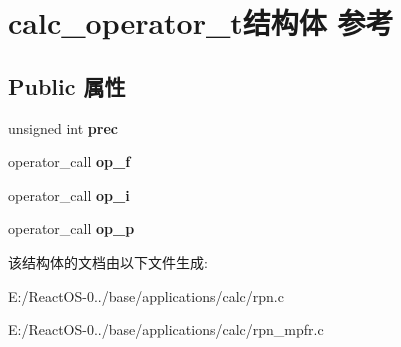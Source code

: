 \hypertarget{structcalc__operator__t}{}\section{calc\+\_\+operator\+\_\+t结构体 参考}
\label{structcalc__operator__t}
\subsection*{Public 属性}
\begin{DoxyCompactItemize}
\item 
\mbox{\label{structcalc__operator__t_a6fb33c37f2f5d0d2e377cea66fe88e3b}} 
unsigned int {\bfseries prec}
\item 
\mbox{\label{structcalc__operator__t_a84204adb334a308d63c4a9a26f3b9985}} 
operator\+\_\+call {\bfseries op\+\_\+f}
\item 
\mbox{\label{structcalc__operator__t_a6a719ae166df029f2ab91b5f86bcdc05}} 
operator\+\_\+call {\bfseries op\+\_\+i}
\item 
\mbox{\label{structcalc__operator__t_a587bc0cfce9207a8b8e659b81e479004}} 
operator\+\_\+call {\bfseries op\+\_\+p}
\end{DoxyCompactItemize}


该结构体的文档由以下文件生成\+:\begin{DoxyCompactItemize}
\item 
E\+:/\+React\+O\+S-\/0../base/applications/calc/rpn.\+c\item 
E\+:/\+React\+O\+S-\/0../base/applications/calc/rpn\+\_\+mpfr.\+c\end{DoxyCompactItemize}
